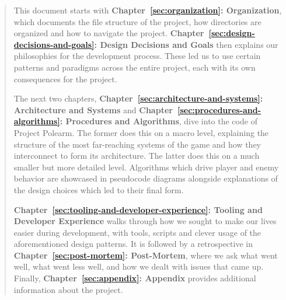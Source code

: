 \documentclass[10pt]{article}
\begin{document}
\begin{abstract}
    This document starts with \textbf{Chapter~\ref{sec:organization}: Organization}, which documents the file structure of the project, how directories are organized and how to navigate the project. \textbf{Chapter~\ref{sec:design-decisions-and-goals}: Design Decisions and Goals} then explains our philosophies for the development process. These led us to use certain patterns and paradigms across the entire project, each with its own consequences for the project.

    The next two chapters, \textbf{Chapter~\ref{sec:architecture-and-systems}: Architecture and Systems} and \textbf{Chapter~\ref{sec:procedures-and-algorithms}: Procedures and Algorithms}, dive into the code of Project Polearm. The former does this on a macro level, explaining the structure of the most far-reaching systems of the game and how they interconnect to form its architecture. The latter does this on a much smaller but more detailed level. Algorithms which drive player and enemy behavior are showcased in pseudocode diagrams alongside explanations of the design choices which led to their final form.

    \textbf{Chapter~\ref{sec:tooling-and-developer-experience}: Tooling and Developer Experience} walks through how we sought to make our lives easier during development, with tools, scripts and clever usage of the aforementioned design patterns. It is followed by a retrospective in \textbf{Chapter~\ref{sec:post-mortem}: Post-Mortem}, where we ask what went well, what went less well, and how we dealt with issues that came up. Finally, \textbf{Chapter~\ref{sec:appendix}: Appendix} provides additional information about the project.
\end{abstract}


\newpage



\tableofcontents

\newpage




\newpage


\newpage


\newpage


\newpage


\newpage


\newpage


\newpage



\printbibliography[heading=bibintoc, title={Bibliography}]
\end{document}
